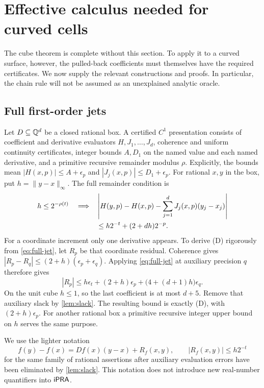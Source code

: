 \section{Effective calculus needed for curved cells}\label{sec:calculus}

The cube theorem is complete without this section. To apply it to a curved
surface, however, the pulled-back coefficients must themselves have the
required certificates. We now supply the relevant constructions and
proofs. In particular, the chain rule will not be assumed as an
unexplained analytic oracle.

\subsection{Full first-order jets}

Let $D\subseteq\mathbb Q^d$ be a closed rational box. A certified $C^1$ presentation
consists of coefficient and derivative evaluators $H,J_1,\ldots,J_d$,
coherence and uniform continuity certificates, integer bounds $A,D_1$
on the named value and each named derivative, and a primitive recursive
remainder modulus $\rho$. Explicitly, the bounds mean
$|H(x,p)|\le A+\epsilon_p$ and $|J_j(x,p)|\le D_1+\epsilon_p$.
For rational $x,y$ in the box, put $h=\|y-x\|_\infty$. The full
remainder condition is
\begin{align}
 h\le2^{-\rho(t)}\quad\Longrightarrow\quad&
 \left|H(y,p)-H(x,p)
             -\sum_{j=1}^dJ_j(x,p)(y_j-x_j)\right|\notag\\
 &\le h2^{-t}+(2+dh)2^{-p}.
 \label{eq:full-jet}
\end{align}
For a coordinate increment only one derivative appears. To derive (D)
rigorously from \eqref{eq:full-jet}, let $R_p$ be that coordinate residual.
Coherence gives
$|R_p-R_q|\le(2+h)(\epsilon_p+\epsilon_q)$.
Applying \eqref{eq:full-jet} at auxiliary precision $q$ therefore gives
\[
 |R_p|\le h\epsilon_t+(2+h)\epsilon_p+
                         \bigl(4+(d+1)h\bigr)\epsilon_q.
\]
On the unit cube $h\le1$, so the last coefficient is at most $d+5$.
Remove that auxiliary slack by \cref{lem:slack}. The resulting bound is
exactly (D), with $(2+h)\epsilon_p$. For another rational box a
primitive recursive integer upper bound on $h$ serves the same purpose.

We use the lighter notation
\begin{equation}\label{eq:jet-semantic}
 f(y)-f(x)=Df(x)(y-x)+R_f(x,y),\qquad
 |R_f(x,y)|\le h2^{-t}
\end{equation}
for the same family of rational assertions after auxiliary evaluation
errors have been eliminated by \cref{lem:slack}. This notation does not
introduce new real-number quantifiers into $\mathsf{iPRA}$.

